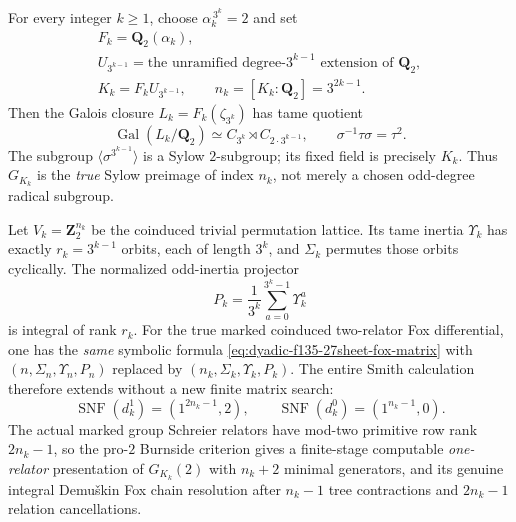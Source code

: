\begin{theorem}
\label{thm:dyadic-f135-all-three-power-sylow-towers}
For every integer
$k\ge1$, choose
$\alpha_k^{\,3^k}=2$
and set
\begin{equation}\label{eq:dyadic-f135-uniform-three-power-fields}
\boxed{
\begin{gathered}
F_k=\mathbf Q_2(\alpha_k),\\
U_{3^{k-1}}=
\text{the unramified degree-}3^{k-1}
\text{ extension of }\mathbf Q_2,\\
K_k=F_kU_{3^{k-1}},\qquad
n_k=[K_k:\mathbf Q_2]=3^{2k-1}.
\end{gathered}}
\end{equation}
Then the Galois
closure
$L_k=F_k(\zeta_{3^k})$
has tame quotient
\begin{equation}\label{eq:dyadic-f135-uniform-tame-quotient}
\boxed{
\operatorname{Gal}(L_k/\mathbf Q_2)
\simeq C_{3^k}\rtimes
C_{2\cdot3^{k-1}},
\qquad
\sigma^{-1}\tau\sigma=\tau^2.
}
\end{equation}
The subgroup
$\langle\sigma^{3^{k-1}}\rangle$
is a Sylow $2$-subgroup;
its fixed field is
precisely $K_k$.
Thus $G_{K_k}$
is the \emph{true}
Sylow preimage
of index $n_k$,
not merely a
chosen odd-degree
radical subgroup.

Let $V_k=\mathbf Z_2^{n_k}$
be the coinduced
trivial permutation
lattice.
Its tame inertia
$\Upsilon_k$
has exactly
$r_k=3^{k-1}$
orbits, each of
length $3^k$,
and $\Sigma_k$
permutes those
orbits cyclically.
The normalized
odd-inertia projector
\[
P_k=\frac1{3^k}
\sum_{a=0}^{3^k-1}\Upsilon_k^a
\]
is integral
of rank $r_k$.
For the true
marked coinduced
two-relator
Fox differential,
one has the
\emph{same}
symbolic formula
\eqref{eq:dyadic-f135-27sheet-fox-matrix}
with
$(n,\Sigma_n,\Upsilon_n,P_n)$
replaced by
$(n_k,\Sigma_k,\Upsilon_k,P_k)$.
The entire
Smith calculation
therefore extends
without a new
finite matrix
search:
\begin{equation}\label{eq:dyadic-f135-uniform-odd-Smith}
\boxed{
\operatorname{SNF}(d_k^1)
=(1^{2n_k-1},2),
\qquad
\operatorname{SNF}(d_k^0)
=(1^{n_k-1},0).
}
\end{equation}
The actual
marked group
Schreier relators
have mod-two
primitive row
rank $2n_k-1$,
so the
pro-$2$ Burnside
criterion gives
a finite-stage
computable
\emph{one-relator}
presentation of
$G_{K_k}(2)$
with $n_k+2$
minimal generators,
and its genuine
integral
Demu\v{s}kin
Fox chain
resolution after
$n_k-1$
tree contractions
and $2n_k-1$
relation cancellations.


\end{theorem}
